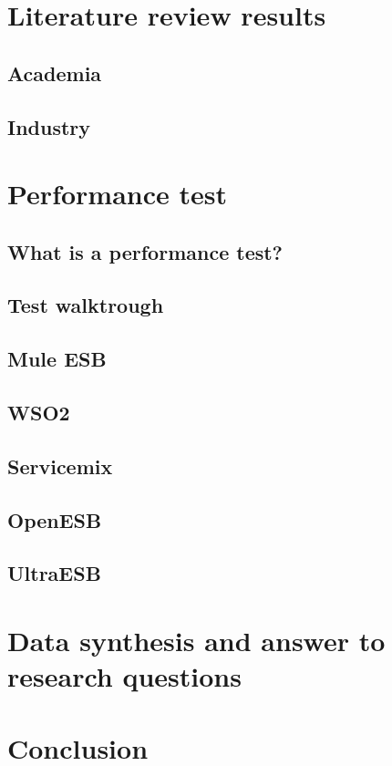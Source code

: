 \documentclass{llncs}
\begin{document}
\label{sec:method}
\section{Literature review results}
\label{sec:litrev}

\subsection{Academia}
\subsection{Industry}

\section{Performance test}
\subsection{What is a performance test?}
\subsection{Test walktrough}
	\subsection{Mule ESB}
	\subsection{WSO2}
	\subsection{Servicemix}
	\subsection{OpenESB}
	\subsection{UltraESB}

\section{Data synthesis and answer to research questions}
\section{Conclusion}



\end{document}
